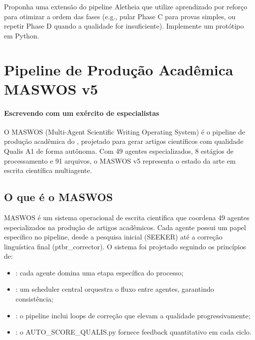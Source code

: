 \begin{exercicio}
Proponha uma extensão do pipeline Aletheia que utilize aprendizado
por reforço para otimizar a ordem das fases (e.g., pular Phase C
para provas simples, ou repetir Phase D quando a qualidade for
insuficiente). Implemente um protótipo em Python.
\end{exercicio}

\section{Pipeline de Produção Acadêmica MASWOS v5}
\label{sec:maswos}
\nivelavancado

\paragraph{Escrevendo com um exército de especialistas} O MASWOS (Multi-Agent Scientific Writing Operating System) é o
pipeline de produção acadêmica do \opencodeeco{}, projetado para
gerar artigos científicos com qualidade Qualis A1 de forma autônoma.
Com 49 agentes especializados, 8 estágios de processamento e 91
arquivos, o MASWOS v5 representa o estado da arte em escrita
científica multiagente.

\subsection{O que é o MASWOS}

MASWOS é um sistema operacional de escrita científica que coordena
49 agentes especializados na produção de artigos acadêmicos. Cada
agente possui um papel específico no pipeline, desde a pesquisa
inicial (SEEKER) até a correção linguística final (ptbr\_corrector).
O sistema foi projetado seguindo os princípios de:

\begin{itemize}
\item {}: cada agente domina uma etapa
específica do processo;
\item {}: um scheduler central orquestra o fluxo
entre agentes, garantindo consistência;
\item {}: o pipeline inclui loops de correção que
elevam a qualidade progressivamente;
\item {}: o AUTO\_SCORE\_QUALIS.py fornece
feedback quantitativo em cada ciclo.
\end{itemize}

